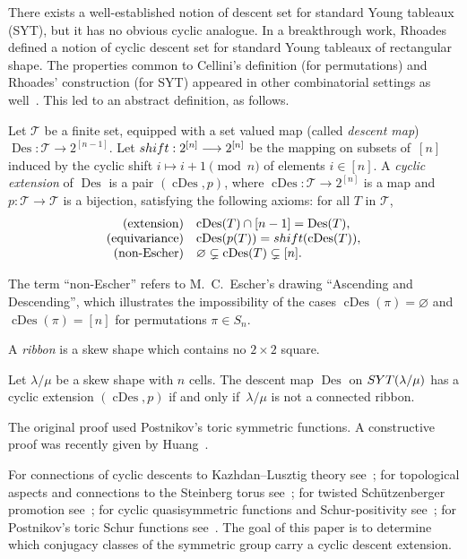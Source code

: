 \documentclass[ALCO,published]{cedram}
\newcommand{\TTT}{\mathcal T}
\DeclareMathOperator\Des{Des}
\DeclareMathOperator\cDes{cDes}
\def\SYT{{\rm SYT}}
\begin{document}
There exists a well-established notion of descent set for standard Young tableaux (SYT), but it has no obvious cyclic analogue. 
In a breakthrough work, Rhoades~\cite{Rhoades} defined a notion of cyclic descent set for standard Young tableaux of rectangular shape.
The properties common to Cellini's definition (for permutations) and Rhoades' construction (for SYT) appeared in other combinatorial settings as well~\cite{PPR, Pechenik, ER, AER}.
This led to an abstract definition, as follows.
	
\begin{definition}\label{def:cDes}
Let $\TTT$ be a finite set, equipped with a set valued map (called {\em descent map}) 
$\Des: \TTT \longrightarrow 2^{[n-1]}$. 
Let ${\rm shift}: 2^{[n]} \longrightarrow 2^{[n]}$ be the mapping on subsets of~$[n]$ induced by the cyclic shift $i \mapsto i + 1 \pmod n$ of elements $i \in [n]$.
A {\em cyclic extension} of $\Des$ is
a pair $(\cDes,p)$, where 
$\cDes: \TTT \longrightarrow 2^{[n]}$ is a map 
and $p: \TTT \longrightarrow \TTT$ is a bijection,
satisfying the following axioms:  for all $T$ in  $\TTT$,
\[
\begin{array}{rl}
\text{(extension)}   & \cDes(T) \cap [n-1] = \Des(T),\\
\text{(equivariance)}& \cDes(p(T))  = {\rm shift}(\cDes(T)),\\
\text{(non-Escher)}  & \varnothing \subsetneq \cDes(T) \subsetneq [n].\\
\end{array}
\]
\end{definition}

The term ``non-Escher'' refers to M.\ C.\ Escher's drawing ``Ascending and Descending'', which illustrates the impossibility
of the cases $\cDes(\pi) = \varnothing$ and $\cDes(\pi) = [n]$ for permutations $\pi \in S_n$.

A {\em ribbon} is a skew shape which contains no $2 \times 2$ square.
	
\begin{theorem}\label{conj1}
    Let $\lambda/\mu$ be a skew shape with $n$ cells.
    The descent map $\Des$ on $\SYT(\lambda/\mu)$ has a cyclic extension $(\cDes,p)$ if and only if~$\lambda/\mu$ is not a connected ribbon.
\end{theorem}
	
The original proof used Postnikov's toric symmetric functions.
A constructive proof was recently given by Huang~\cite{Huang}.

For connections of cyclic descents to 
Kazhdan--Lusztig theory see~\cite{Rhoades}; for topological aspects and connections to the  
Steinberg torus see~\cite{DPS}; for twisted Sch\"utzenberger promotion see~\cite{Rhoades, Huang}; for cyclic quasisymmetric functions and Schur-positivity see~\cite{AGRR};	for Postnikov's toric Schur functions see~\cite{ARR}.
The goal of this paper is to determine which conjugacy classes of the symmetric group carry a cyclic descent extension.
		
\end{document}
